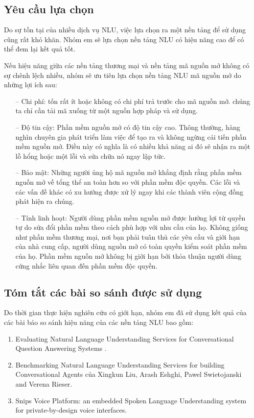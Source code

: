 \subsection{Yêu cầu lựa chọn}
Do sự tồn tại của nhiều dịch vụ NLU, việc lựa chọn ra một nền tảng để sử dụng cũng rất khó khăn. Nhóm em sẽ lựa chọn nền tảng NLU có hiệu năng cao để có thể đem lại kết quả tốt.

Nếu hiệu năng giữa các nền tảng thương mại và nền tảng mã nguồn mở không có sự chênh lệch nhiều, nhóm sẽ ưu tiên lựa chọn nền tảng NLU mã nguồn mở do những lợi ích sau:
\begin{itemize}
    \item[--] Chi phí:  tốn rất ít hoặc không có chi phí trả trước cho mã nguồn mở. chúng ta chỉ cần tải mã xuống từ một nguồn hợp pháp và sử dụng.
    \item[--] Độ tin cậy: Phần mềm nguồn mở có độ tin cậy cao. Thông thường, hàng nghìn chuyên gia phát triển làm việc để tạo ra và không ngừng cải tiến phần mềm nguồn mở. Điều này có nghĩa là có nhiều khả năng ai đó sẽ nhận ra một lỗ hổng hoặc một lỗi và sửa chữa nó ngay lập tức.
    \item[--] Bảo mật: Những người ủng hộ mã nguồn mở khẳng định rằng phần mềm nguồn mở về tổng thể an toàn hơn so với phần mềm độc quyền. Các lỗi và các vấn đề khác có xu hướng được xử lý ngay khi các thành viên cộng đồng phát hiện ra chúng.
    \item[--] Tính linh hoạt: Người dùng phần mềm nguồn mở được hưởng lợi từ quyền tự do sửa đổi phần mềm theo cách phù hợp với nhu cầu của họ. Không giống như phần mềm thương mại, nơi bạn phải tuân thủ các yêu cầu và giới hạn của nhà cung cấp, người dùng nguồn mở có toàn quyền kiểm soát phần mềm của họ. Phần mềm nguồn mở không bị giới hạn bởi thỏa thuận người dùng cứng nhắc liên quan đến phần mềm độc quyền.
\end{itemize}

\subsection{Tóm tắt các bài so sánh được sử dụng}

Do thời gian thực hiện nghiên cứu có giới hạn, nhóm em đã sử dụng kết quả của các bài báo so sánh hiệu năng của các nền tảng NLU bao gồm:

\begin{enumerate}
    \item Evaluating Natural Language Understanding Services for Conversational Question Answering Systems \cite{EvaluatingNLU}.
    \item Benchmarking Natural Language Understanding Services for building Conversational Agents của Xingkun Liu, Arash Eshghi, Pawel Swietojanski and Verena Rieser\cite{BenchmarkingNLU}.
    \item Snips Voice Platform: an embedded Spoken Language Understanding system for private-by-design voice interfaces\cite{snips-nlu}.
\end{enumerate}

